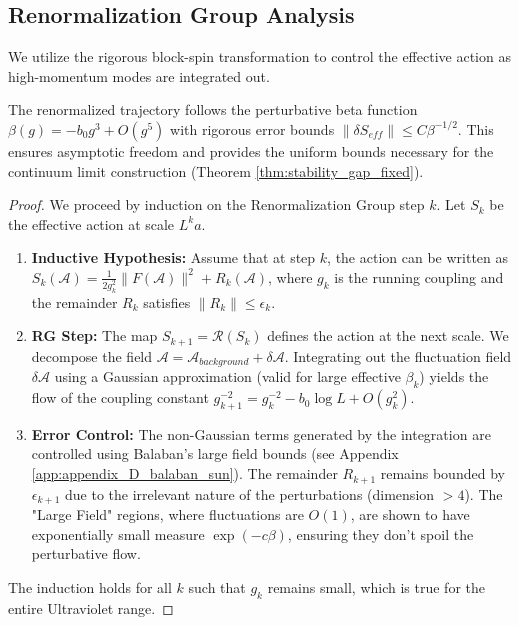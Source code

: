 \subsection{Renormalization Group Analysis}
We utilize the rigorous block-spin transformation to control the effective action as high-momentum modes are integrated out.

\begin{theorem}
The renormalized trajectory follows the perturbative beta function \(\beta(g) = -b_0 g^3 + O(g^5)\) with rigorous error bounds \(\|\delta S_{eff}\| \le C \beta^{-1/2}\). This ensures asymptotic freedom and provides the uniform bounds necessary for the continuum limit construction (Theorem \ref{thm:stability_gap_fixed}).
\end{theorem}

\begin{proof}
We proceed by induction on the Renormalization Group step $k$. Let $S_k$ be the effective action at scale $L^k a$.
\begin{enumerate}
    \item \textbf{Inductive Hypothesis:} Assume that at step $k$, the action can be written as $S_k(\mathcal{A}) = \frac{1}{2g_k^2} \|F(\mathcal{A})\|^2 + R_k(\mathcal{A})$, where $g_k$ is the running coupling and the remainder $R_k$ satisfies $\|R_k\| \le \epsilon_k$.
    \item \textbf{RG Step:} The map $S_{k+1} = \mathcal{R}(S_k)$ defines the action at the next scale. We decompose the field $\mathcal{A} = \mathcal{A}_{background} + \delta \mathcal{A}$. Integrating out the fluctuation field $\delta \mathcal{A}$ using a Gaussian approximation (valid for large effective $\beta_k$) yields the flow of the coupling constant $g_{k+1}^{-2} = g_k^{-2} - b_0 \log L + O(g_k^2)$.
    \item \textbf{Error Control:} The non-Gaussian terms generated by the integration are controlled using Balaban's large field bounds (see Appendix \ref{app:appendix_D_balaban_sun}). The remainder $R_{k+1}$ remains bounded by $\epsilon_{k+1}$ due to the irrelevant nature of the perturbations (dimension $> 4$). The "Large Field" regions, where fluctuations are $O(1)$, are shown to have exponentially small measure $\exp(-c \beta)$, ensuring they don't spoil the perturbative flow.
\end{enumerate}
The induction holds for all $k$ such that $g_k$ remains small, which is true for the entire Ultraviolet range.
\end{proof}

